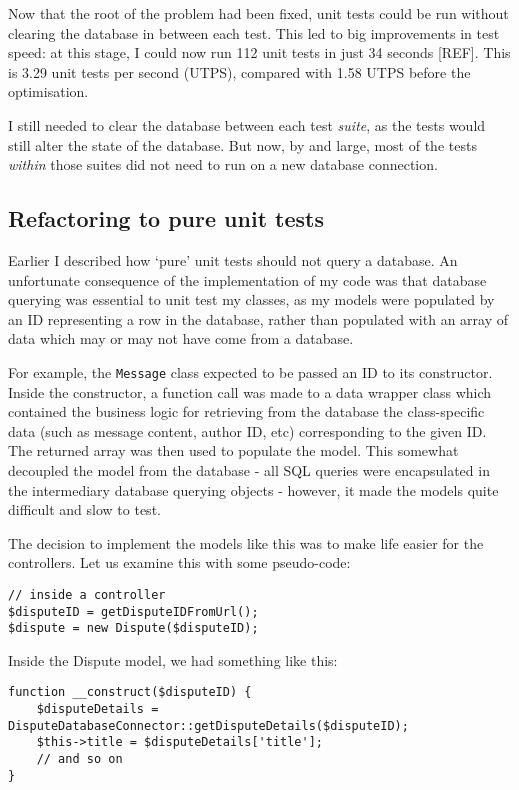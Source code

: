 Now that the root of the problem had been fixed, unit tests could be run without clearing the database in between each test. This led to big improvements in test speed: at this stage, I could now run 112 unit tests in just 34 seconds [REF]. This is 3.29 unit tests per second (UTPS), compared with 1.58 UTPS before the optimisation. %

I still needed to clear the database between each test \emph{suite}, as the tests would still alter the state of the database. But now, by and large, most of the tests \emph{within} those suites did not need to run on a new database connection.

\subsection{Refactoring to pure unit tests}

Earlier I described how `pure' unit tests should not query a database. An unfortunate consequence of the implementation of my code was that database querying was essential to unit test my classes, as my models were populated by an ID representing a row in the database, rather than populated with an array of data which may or may not have come from a database.

For example, the \lstinline{Message} class expected to be passed an ID to its constructor. Inside the constructor, a function call was made to a data wrapper class which contained the business logic for retrieving from the database the class-specific data (such as message content, author ID, etc) corresponding to the given ID. The returned array was then used to populate the model. This somewhat decoupled the model from the database - all SQL queries were encapsulated in the intermediary database querying objects - however, it made the models quite difficult and slow to test.

The decision to implement the models like this was to make life easier for the controllers. Let us examine this with some pseudo-code:

\begin{lstlisting}
// inside a controller
$disputeID = getDisputeIDFromUrl();
$dispute = new Dispute($disputeID);
\end{lstlisting}

Inside the Dispute model, we had something like this:

\begin{minipage}{\textwidth}
\begin{lstlisting}
function __construct($disputeID) {
    $disputeDetails = DisputeDatabaseConnector::getDisputeDetails($disputeID);
    $this->title = $disputeDetails['title'];
    // and so on
}
\end{lstlisting}
\end{minipage}

